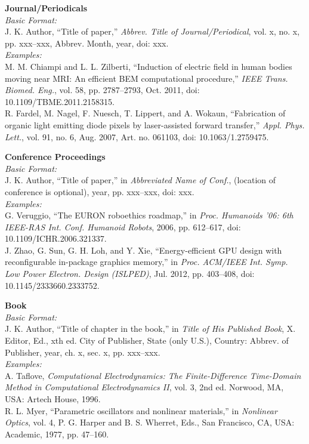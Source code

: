 \documentclass[10pt,a4paper]{article}
\begin{document}
\vspace{6pt}
{\fontsize{8.5pt}{11pt}\selectfont
\textbf{Journal/Periodicals}\\
\textit{Basic Format:}\\
J. K. Author, ``Title of paper,'' \textit{Abbrev. Title of Journal/Periodical}, vol. x, no. x, pp. xxx--xxx, Abbrev. Month, year, doi: xxx.\\
\textit{Examples:}\\
M. M. Chiampi and L. L. Zilberti, ``Induction of electric field in human bodies moving near MRI: An efficient BEM computational procedure,'' \textit{IEEE Trans. Biomed. Eng.}, vol. 58, pp. 2787--2793, Oct. 2011, doi: 10.1109/TBME.2011.2158315.\\
R. Fardel, M. Nagel, F. Nuesch, T. Lippert, and A. Wokaun, ``Fabrication of organic light emitting diode pixels by laser-assisted forward transfer,'' \textit{Appl. Phys. Lett.}, vol. 91, no. 6, Aug. 2007, Art. no. 061103, doi: 10.1063/1.2759475.
\par\vspace{4pt}

\textbf{Conference Proceedings}\\
\textit{Basic Format:}\\
J. K. Author, ``Title of paper,'' in \textit{Abbreviated Name of Conf.}, (location of conference is optional), year, pp. xxx--xxx, doi: xxx.\\
\textit{Examples:}\\
G. Veruggio, ``The EURON roboethics roadmap,'' in \textit{Proc. Humanoids '06: 6th IEEE-RAS Int. Conf. Humanoid Robots}, 2006, pp. 612--617, doi: 10.1109/ICHR.2006.321337.\\
J. Zhao, G. Sun, G. H. Loh, and Y. Xie, ``Energy-efficient GPU design with reconfigurable in-package graphics memory,'' in \textit{Proc. ACM/IEEE Int. Symp. Low Power Electron. Design (ISLPED)}, Jul. 2012, pp. 403--408, doi: 10.1145/2333660.2333752.
\par\vspace{4pt}

\textbf{Book}\\
\textit{Basic Format:}\\
J. K. Author, ``Title of chapter in the book,'' in \textit{Title of His Published Book}, X. Editor, Ed., xth ed. City of Publisher, State (only U.S.), Country: Abbrev. of Publisher, year, ch. x, sec. x, pp. xxx--xxx.\\
\textit{Examples:}\\
A. Taflove, \textit{Computational Electrodynamics: The Finite-Difference Time-Domain Method in Computational Electrodynamics II}, vol. 3, 2nd ed. Norwood, MA, USA: Artech House, 1996.\\
R. L. Myer, ``Parametric oscillators and nonlinear materials,'' in \textit{Nonlinear Optics}, vol. 4, P. G. Harper and B. S. Wherret, Eds., San Francisco, CA, USA: Academic, 1977, pp. 47--160.
\par\vspace{4pt}

}
\end{document}
